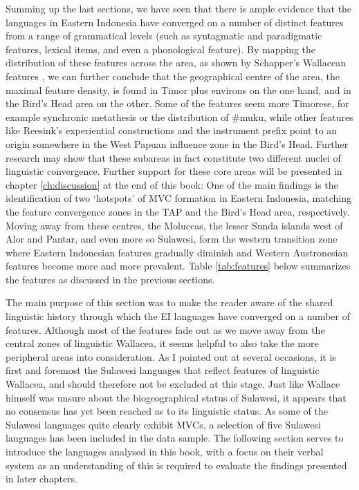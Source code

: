 Summing up the last sections, we have seen that there is ample evidence that the languages in Eastern Indonesia have converged on a number of distinct features from a range of grammatical levels (such as syntagmatic and paradigmatic features, lexical items, and even a phonological feature). By mapping the distribution of these features across the area, as shown by Schapper's Wallacean features \citep[138f.]{schapper2015wallacea}, we can further conclude that the geographical centre of the area, the maximal feature density, is found in Timor plus environs on the one hand, and in the Bird's Head area on the other. Some of the features seem more Timorese, for example synchronic metathesis or the distribution of \#muku, while other features like Reesink's experiential constructions and the instrument prefix point to an origin somewhere in the West Papuan influence zone in the Bird's Head. Further research may show that these subareas in fact constitute two different nuclei of linguistic convergence. Further support for these core areas will be presented in chapter \ref{ch:discussion} at the end of this book: One of the main findings is the identification of two `hotspots' of MVC formation in Eastern Indonesia, matching the feature convergence zones in the TAP and the Bird's Head area, respectively. Moving away from these centres, the Moluccas, the lesser Sunda islands west of Alor and Pantar, and even more so Sulawesi, form the western transition zone where Eastern Indonesian features gradually diminish and Western Austronesian features become more and more prevalent. Table \ref{tab:features} below summarizes the features as discussed in the previous sections.

The main purpose of this section was to make the reader aware of the shared linguistic history through which the EI languages have converged on a number of features. Although most of the features fade out as we move away from the central zones of linguistic Wallacea, it seems helpful to also take the more peripheral areas into consideration. As I pointed out at several occasions, it is first and foremost the Sulawesi languages that reflect features of linguistic Wallacea, and should therefore not be excluded at this stage. Just like Wallace himself was unsure about the biogeographical status of Sulawesi, it appears that no consensus has yet been reached as to its linguistic status. As some of the Sulawesi languages quite clearly exhibit MVCs, a selection of five Sulawesi languages has been included in the data sample. The following section serves to introduce the languages analysed in this book, with a focus on their verbal system as an understanding of this is required to evaluate the findings presented in later chapters.

